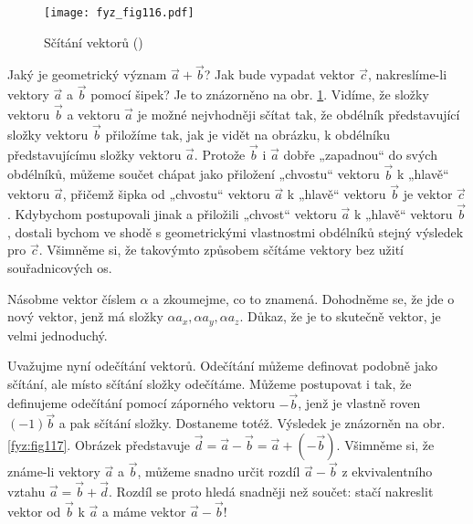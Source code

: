 {    \begin{figure}[ht!]  %
      \centering
      \texttt{[image: fyz\_fig116.pdf]}
      \caption{Sčítání vektorů
              (\cite[s.~160]{Feynman01})}
      \label{fyz:fig116}
    \end{figure}
    Jaký je geometrický význam \(\vec{a} + \vec{b}\)? Jak bude vypadat vektor \(\vec{c}\), 
    nakreslíme-li vektory \(\vec{a}\) a \(\vec{b}\) pomocí šipek? Je to znázorněno na obr. 
    \ref{fyz:fig116}. Vidíme, že složky vektoru \(\vec{b}\) a vektoru \(\vec{a}\) je možné 
    nejvhodněji sčítat tak, že obdélník představující složky vektoru \(\vec{b}\) přiložíme tak, jak 
    je vidět na obrázku, k obdélníku představujícímu složky vektoru \(\vec{a}\). Protože 
    \(\vec{b}\) i \(\vec{a}\) dobře „zapadnou“ do svých obdélníků, můžeme součet chápat jako 
    přiložení „chvostu“ vektoru \(\vec{b}\) k „hlavě“ vektoru \(\vec{a}\), přičemž šipka od 
    „chvostu“ vektoru \(\vec{a}\) k „hlavě“ vektoru \(\vec{b}\) je vektor \(\vec{c}\). Kdybychom 
    postupovali jinak a přiložili „chvost“ vektoru \(\vec{a}\) k „hlavě“ vektoru \(\vec{b}\), 
    dostali bychom ve shodě s geometrickými vlastnostmi obdélníků stejný výsledek pro \(\vec{c}\). 
    Všimněme si, že takovýmto způsobem sčítáme vektory bez užití souřadnicových os.
    
    Násobme vektor číslem \(\alpha\) a zkoumejme, co to znamená. Dohodněme se, že jde o nový 
    vektor, jenž má složky \(\alpha a_x, \alpha a_y, \alpha a_z\). Důkaz, že je to skutečně vektor, 
    je velmi jednoduchý.
    
    Uvažujme nyní odečítání vektorů. Odečítání můžeme definovat podobně jako sčítání, ale místo 
    sčítání složky odečítáme. Můžeme postupovat i tak, že definujeme odečítání pomocí záporného 
    vektoru \(-\vec{b}\), jenž je vlastně roven \((-1)\vec{b}\) a pak sčítání složky. Dostaneme 
    totéž. Výsledek je znázorněn na obr. \ref{fyz:fig117}. Obrázek představuje \(\vec{d} = \vec{a} 
    - \vec{b} = \vec{a} + (-\vec{b})\). Všimněme si, že známe-li vektory \(\vec{a}\) a \(\vec{b}\), 
    můžeme snadno určit rozdíl \(\vec{a} - \vec{b}\) z ekvivalentního vztahu \(\vec{a} = \vec{b} + 
    \vec{d}\). Rozdíl se proto hledá snadněji než součet: stačí nakreslit vektor od \(\vec{b}\) k 
    \(\vec{a}\) a máme vektor \(\vec{a} - \vec{b}\)!
    

}
